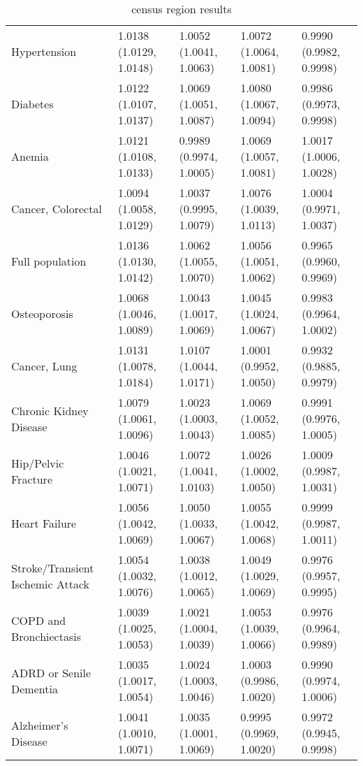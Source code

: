 \begin{table}[ht]
\begin{tabular}{lllll}
  Hypertension & 1.0138 (1.0129, 1.0148) & 1.0052 (1.0041, 1.0063) & 1.0072 (1.0064, 1.0081) & 0.9990 (0.9982, 0.9998) \\ 
  Diabetes & 1.0122 (1.0107, 1.0137) & 1.0069 (1.0051, 1.0087) & 1.0080 (1.0067, 1.0094) & 0.9986 (0.9973, 0.9998) \\ 
  Anemia & 1.0121 (1.0108, 1.0133) & 0.9989 (0.9974, 1.0005) & 1.0069 (1.0057, 1.0081) & 1.0017 (1.0006, 1.0028) \\ 
  Cancer, Colorectal & 1.0094 (1.0058, 1.0129) & 1.0037 (0.9995, 1.0079) & 1.0076 (1.0039, 1.0113) & 1.0004 (0.9971, 1.0037) \\ 
  Full population & 1.0136 (1.0130, 1.0142) & 1.0062 (1.0055, 1.0070) & 1.0056 (1.0051, 1.0062) & 0.9965 (0.9960, 0.9969) \\ 
  Osteoporosis & 1.0068 (1.0046, 1.0089) & 1.0043 (1.0017, 1.0069) & 1.0045 (1.0024, 1.0067) & 0.9983 (0.9964, 1.0002) \\ 
  Cancer, Lung & 1.0131 (1.0078, 1.0184) & 1.0107 (1.0044, 1.0171) & 1.0001 (0.9952, 1.0050) & 0.9932 (0.9885, 0.9979) \\ 
  Chronic Kidney Disease & 1.0079 (1.0061, 1.0096) & 1.0023 (1.0003, 1.0043) & 1.0069 (1.0052, 1.0085) & 0.9991 (0.9976, 1.0005) \\ 
  Hip/Pelvic Fracture & 1.0046 (1.0021, 1.0071) & 1.0072 (1.0041, 1.0103) & 1.0026 (1.0002, 1.0050) & 1.0009 (0.9987, 1.0031) \\ 
  Heart Failure & 1.0056 (1.0042, 1.0069) & 1.0050 (1.0033, 1.0067) & 1.0055 (1.0042, 1.0068) & 0.9999 (0.9987, 1.0011) \\ 
  Stroke/Transient Ischemic Attack & 1.0054 (1.0032, 1.0076) & 1.0038 (1.0012, 1.0065) & 1.0049 (1.0029, 1.0069) & 0.9976 (0.9957, 0.9995) \\ 
  COPD and Bronchiectasis & 1.0039 (1.0025, 1.0053) & 1.0021 (1.0004, 1.0039) & 1.0053 (1.0039, 1.0066) & 0.9976 (0.9964, 0.9989) \\ 
  ADRD or Senile Dementia & 1.0035 (1.0017, 1.0054) & 1.0024 (1.0003, 1.0046) & 1.0003 (0.9986, 1.0020) & 0.9990 (0.9974, 1.0006) \\ 
  Alzheimer's Disease & 1.0041 (1.0010, 1.0071) & 1.0035 (1.0001, 1.0069) & 0.9995 (0.9969, 1.0020) & 0.9972 (0.9945, 0.9998) \\ 
   \hline
\end{tabular}
\caption{census region results} 
\label{tab:stratified_OR_table_census_region}
\end{table}
